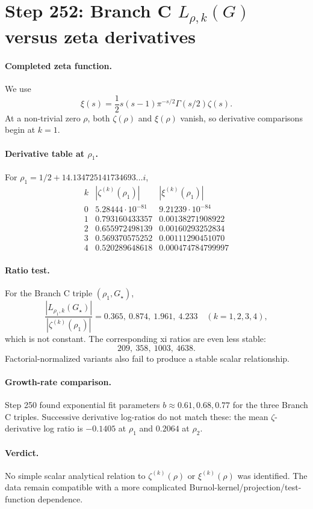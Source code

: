 \section*{Step 252: Branch C \(L_{\rho,k}(G)\) versus zeta derivatives}

\paragraph{Completed zeta function.}
We use
\[
\xi(s)=\frac12 s(s-1)\pi^{-s/2}\Gamma(s/2)\zeta(s).
\]
At a non-trivial zero \(\rho\), both \(\zeta(\rho)\) and \(\xi(\rho)\) vanish,
so derivative comparisons begin at \(k=1\).

\paragraph{Derivative table at \(\rho_1\).}
For \(\rho_1=1/2+14.134725141734693\ldots i\),
\[
\begin{array}{c|cc}
k & |\zeta^{(k)}(\rho_1)| & |\xi^{(k)}(\rho_1)|\\
\hline
0 & 5.28444\cdot10^{-81} & 9.21239\cdot10^{-84}\\
1 & 0.793160433357 & 0.00138271908922\\
2 & 0.655972498139 & 0.00160293252834\\
3 & 0.569370575252 & 0.00111290451070\\
4 & 0.520289648618 & 0.000474784799997
\end{array}
\]

\paragraph{Ratio test.}
For the Branch C triple \((\rho_1,G_\star)\),
\[
\frac{|L_{\rho_1,k}(G_\star)|}{|\zeta^{(k)}(\rho_1)|}
=0.365,\ 0.874,\ 1.961,\ 4.233
\quad (k=1,2,3,4),
\]
which is not constant.  The corresponding xi ratios are even less stable:
\[
209,\ 358,\ 1003,\ 4638.
\]
Factorial-normalized variants also fail to produce a stable scalar
relationship.

\paragraph{Growth-rate comparison.}
Step 250 found exponential fit parameters \(b\approx0.61,0.68,0.77\) for the
three Branch C triples.  Successive derivative log-ratios do not match these:
the mean \(\zeta\)-derivative log ratio is \(-0.1405\) at \(\rho_1\) and
\(0.2064\) at \(\rho_2\).

\paragraph{Verdict.}
No simple scalar analytical relation to \(\zeta^{(k)}(\rho)\) or
\(\xi^{(k)}(\rho)\) was identified.  The data remain compatible with a more
complicated Burnol-kernel/projection/test-function dependence.
